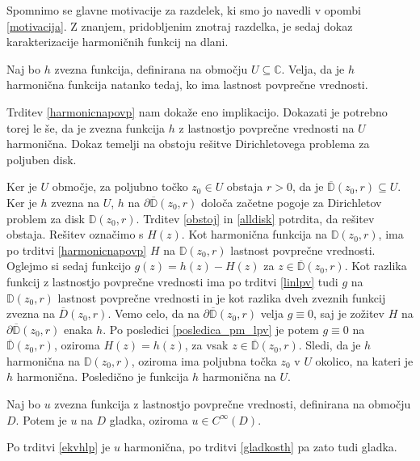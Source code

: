 \documentclass[mat1]{fmfdelo}
\newcommand{\C}{\mathbb C}
\begin{document}
     \begin{opomba}
        Spomnimo se glavne motivacije za razdelek, ki smo jo navedli v opombi \ref{motivacija}.
        Z znanjem, pridobljenim znotraj razdelka, je sedaj dokaz karakterizacije harmoničnih funkcij na dlani.
     \end{opomba}
     \begin{trditev}
        \label{ekvhlp}
        Naj bo $h$ zvezna funkcija, definirana na območju $U \subseteq \C$. Velja, da je $h$ harmonična funkcija natanko tedaj, ko ima lastnost povprečne vrednosti.
    \end{trditev}
    \begin{dokaz}
        Trditev \ref{harmonicnapovp} nam dokaže eno implikacijo. Dokazati je potrebno torej le še, da je zvezna funkcija $h$ z lastnostjo povprečne vrednosti na $U$ harmonična. 
        Dokaz temelji na obstoju rešitve Dirichletovega problema za poljuben disk. 
        
        Ker je $U$ območje, za poljubno točko $z_0 \in U$ obstaja $r>0$, da je $\overline{\mathbb{D}}(z_0,r) \subseteq U$. Ker je $h$ zvezna na $U$, $h$ na $\partial \overline{\mathbb{D}}(z_0, r)$ določa začetne pogoje za Dirichletov problem za disk $\mathbb{D}(z_0,r)$.
        Trditev \ref{obstoj} in \ref{alldisk} potrdita, da rešitev obstaja. Rešitev označimo s $H(z)$.
        Kot harmonična funkcija na $\mathbb{D}(z_0, r)$, ima po trditvi \ref{harmonicnapovp} $H$ na $\mathbb{D}(z_0, r)$ lastnost povprečne vrednosti. 
        Oglejmo si sedaj funkcijo $g(z) = h(z) - H(z)$ za $z \in \overline{\mathbb{D}}(z_0,r)$. 
        Kot razlika funkcij z lastnostjo povprečne vrednosti ima po trditvi \ref{linlpv} tudi $g$ na $\mathbb{D}(z_0, r)$ lastnost povprečne vrednosti in je kot razlika dveh zveznih funkcij zvezna na $\overline{D}(z_0, r)$.
        Vemo celo, da na $\partial \overline{\mathbb{D}}(z_0, r)$ velja $g \equiv 0$, saj je zožitev $H$ na $\partial \overline{\mathbb{D}}(z_0,r)$ enaka $h$. 
        Po posledici \ref{posledica_pm_lpv} je potem $g \equiv 0$ na $\overline{\mathbb{D}}(z_0, r)$, oziroma $H(z) =  h(z)$, za vsak $z \in \overline{\mathbb{D}}(z_0, r)$. Sledi, da je $h$ harmonična na $\mathbb{D}(z_0, r)$, oziroma ima poljubna točka $z_0$ v $U$ okolico, na kateri je $h$ harmonična. 
        Posledično je funkcija $h$ harmonična na $U$.
    \end{dokaz}
    \begin{posledica}
        Naj bo $u$ zvezna funkcija z lastnostjo povprečne vrednosti, definirana na območju $D$. Potem je $u$ na $D$ gladka, oziroma $u \in C^{\infty}(D)$.
    \end{posledica}
    \begin{dokaz}
        Po trditvi \ref{ekvhlp} je $u$ harmonična, po trditvi \ref{gladkosth} pa zato tudi gladka.
    \end{dokaz}
\newpage
\end{document}
